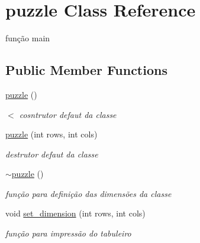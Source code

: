 \hypertarget{classpuzzle}{}\section{puzzle Class Reference}
\label{classpuzzle}


função main  


\subsection*{Public Member Functions}
\begin{DoxyCompactItemize}
\item 
\mbox{\label{classpuzzle_a300d0306c31f896856f72208cb3cec2b}} 
\hyperlink{classpuzzle_a300d0306c31f896856f72208cb3cec2b}{puzzle} ()
\begin{DoxyCompactList}\small\item\em $<$ cosntrutor defaut da classe \end{DoxyCompactList}\item 
\mbox{\label{classpuzzle_aeec04e934d82cdf71c4ae596b73854a3}} 
\hyperlink{classpuzzle_aeec04e934d82cdf71c4ae596b73854a3}{puzzle} (int rows, int cols)
\begin{DoxyCompactList}\small\item\em destrutor defaut da classe \end{DoxyCompactList}\item 
\mbox{\label{classpuzzle_a6dd3ee94dd2c09821162bce3f18b588c}} 
\hyperlink{classpuzzle_a6dd3ee94dd2c09821162bce3f18b588c}{$\sim$puzzle} ()
\begin{DoxyCompactList}\small\item\em função para definição das dimensões da classe \end{DoxyCompactList}\item 
\mbox{\label{classpuzzle_a1e4d77cc99ade3d920b49a37c28ecde7}} 
void \hyperlink{classpuzzle_a1e4d77cc99ade3d920b49a37c28ecde7}{set\+\_\+dimension} (int rows, int cols)
\begin{DoxyCompactList}\small\item\em função para impressão do tabuleiro \end{DoxyCompactList}\item 
\mbox{\label{classpuzzle_a842cbb0148e02ce593363dabbdb0d4c5}} 

\end{DoxyCompactItemize}
